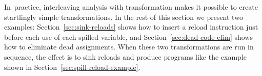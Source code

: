 \documentclass[blockstyle,preprint,nocopyrightspace]{sigplanconf}
\newcommand{\authornote}[1]{{\em #1}}
\def\authornote#1{\unskip\relax}
\newcommand{\simon}[1]{\authornote{SLPJ: #1}}
\newcommand\secref[1]{Section~\ref{sec:#1}}
\begin{document}


In~practice, interleaving analysis with transformation makes it
possible to create startlingly simple transformations.
In the rest of this section we present two examples:
\secref{sink-reloads} shows how to insert a reload instruction just
before each use of each spilled variable, and
\secref{dead-code-elim} shows how to eliminate dead assignments.
When these two transformations are run in sequence, the effect is to
sink reloads and produce programs like the example shown in
\secref{spill-reload-example}. 
\end{document}
